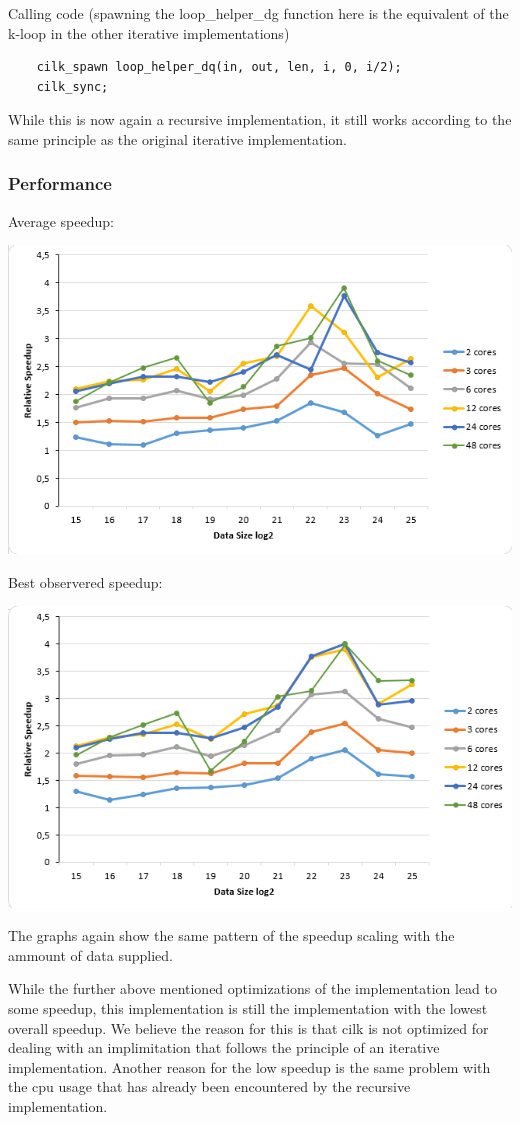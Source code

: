 Calling code (spawning the loop\_helper\_dg function here is the equivalent of the k-loop in the other iterative implementations)
\begin{lstlisting}
	cilk_spawn loop_helper_dq(in, out, len, i, 0, i/2);
    cilk_sync;
\end{lstlisting}

While this is now again a recursive implementation, it still works according to the same principle as the original iterative implementation. 

\subsubsection{Performance}

Average speedup:

\includegraphics[width=\textwidth]{cilk_it_avg.png}

Best observered speedup:

\includegraphics[width=\textwidth]{cilk_it_best.png}

The graphs again show the same pattern of the speedup scaling with the ammount of data supplied. 

While the further above mentioned optimizations of the implementation lead to some speedup, this implementation is still the implementation with the lowest overall speedup. We believe the reason for this is that cilk is not optimized for dealing with an implimitation that follows the principle of an iterative implementation. Another reason for the low speedup is the same problem with the cpu usage that has already been encountered by the recursive implementation.